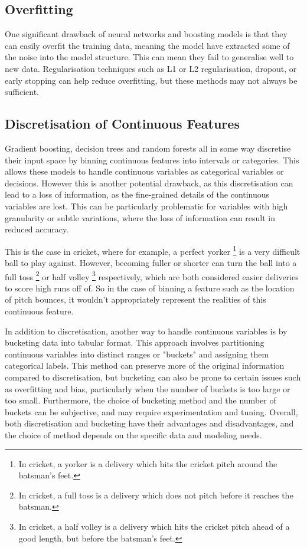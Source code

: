 \documentclass[12pt,a4paper]{report}
\theoremstyle{definition}
\begin{document}
\subsection{Overfitting}

One significant drawback of neural networks and boosting models is that they can easily overfit the training data, meaning the model have extracted some of the noise into the model structure.
This can mean they fail to generalise well to new data. 
Regularisation techniques such as L1 or L2 regularisation, dropout, or early stopping can help reduce overfitting, but these methods may not always be sufficient.

\subsection{Discretisation of Continuous Features}

Gradient boosting, decision trees and random forests all in some way discretise their input space by binning continuous features into intervals or categories. 
This allows these models to handle continuous variables as categorical variables or decisions.
However this is another potential drawback, as this discretisation can lead to a loss of information, as the fine-grained details of the continuous variables are lost. 
This can be particularly problematic for variables with high granularity or subtle variations, where the loss of information can result in reduced accuracy.

This is the case in cricket, where for example, a perfect yorker \footnote{In cricket, a yorker is a delivery which hits the cricket pitch around the batsman's feet.} is a very difficult ball to play against. 
However, becoming fuller or shorter can turn the ball into a full toss \footnote{In cricket, a full toss is a delivery which does not pitch before it reaches the batsman.} or half volley \footnote{In cricket, a half volley is a delivery which hits the cricket pitch ahead of a good length, but before the batsman's feet.} respectively, which are both considered easier deliveries to score high runs off of.
So in the case of binning a feature such as the location of pitch bounces, it wouldn't appropriately represent the realities of this continuous feature.

In addition to discretisation, another way to handle continuous variables is by bucketing data into tabular format. 
This approach involves partitioning continuous variables into distinct ranges or "buckets" and assigning them categorical labels. 
This method can preserve more of the original information compared to discretisation, but bucketing can also be prone to certain issues such as overfitting and bias, particularly when the number of buckets is too large or too small. 
Furthermore, the choice of bucketing method and the number of buckets can be subjective, and may require experimentation and tuning. 
Overall, both discretisation and bucketing have their advantages and disadvantages, and the choice of method depends on the specific data and modeling needs.
\end{document}
